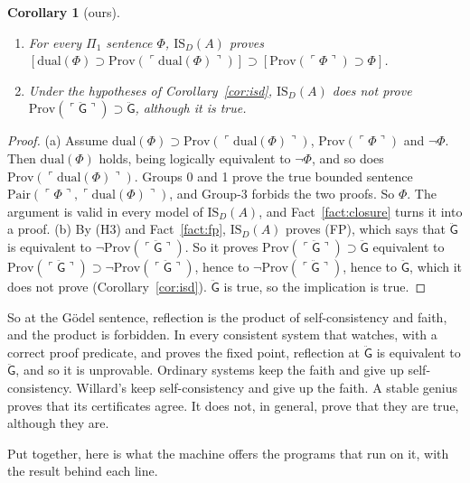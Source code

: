 \documentclass[11pt]{article}
\newcommand{\G}{\ddot{\mathsf{G}}}          %
\newcommand{\Prov}{\mathrm{Prov}}
\newcommand{\Pair}{\mathrm{Pair}}
\newcommand{\gn}[1]{\ulcorner #1\urcorner}  %
\newcommand{\ISD}{\mathrm{IS}_D(A)}
\theoremstyle{plain}
\newtheorem{corollary}[theorem]{Corollary}
\theoremstyle{definition}
\begin{document}
\begin{corollary}[ours]\label{cor:reflect}
\leavevmode
\begin{enumerate}[label=(\alph*)]
\item For every $\Pi_1$ sentence $\Phi$, $\ISD$ proves
  $[\mathrm{dual}(\Phi) \supset \Prov(\gn{\mathrm{dual}(\Phi)})] \supset
  [\Prov(\gn{\Phi}) \supset \Phi]$.
\item Under the hypotheses of Corollary~\ref{cor:isd}, $\ISD$ does not prove
  $\Prov(\gn{\G}) \supset \G$, although it is true.
\end{enumerate}
\end{corollary}

\begin{proof}
(a) Assume $\mathrm{dual}(\Phi) \supset \Prov(\gn{\mathrm{dual}(\Phi)})$,
$\Prov(\gn{\Phi})$ and $\neg\Phi$. Then $\mathrm{dual}(\Phi)$ holds, being
logically equivalent to $\neg\Phi$, and so does
$\Prov(\gn{\mathrm{dual}(\Phi)})$. Groups 0 and 1 prove the true bounded
sentence $\Pair(\gn{\Phi}, \gn{\mathrm{dual}(\Phi)})$, and Group-3 forbids
the two proofs. So $\Phi$. The argument is valid in every model of $\ISD$,
and Fact~\ref{fact:closure} turns it into a proof. (b) By (H3) and
Fact~\ref{fact:fp}, $\ISD$ proves (FP), which says that $\G$ is equivalent
to $\neg\Prov(\gn{\G})$. So it proves $\Prov(\gn{\G}) \supset \G$ equivalent
to $\Prov(\gn{\G}) \supset \neg\Prov(\gn{\G})$, hence to
$\neg\Prov(\gn{\G})$, hence to $\G$, which it does not prove
(Corollary~\ref{cor:isd}). $\G$ is true, so the implication is true.
\end{proof}

\noindent
So at the Gödel sentence, reflection is the product of self-consistency and
faith, and the product is forbidden. In every consistent system that
watches, with a correct proof predicate, and proves the fixed point,
reflection at $\G$ is equivalent to $\G$, and so it is unprovable. Ordinary
systems keep the faith and give up self-consistency. Willard's keep
self-consistency and give up the faith. A stable genius proves that its
certificates agree. It does not, in general, prove that they are true,
although they are.

Put together, here is what the machine offers the programs that run on it,
with the result behind each line.
\end{document}
